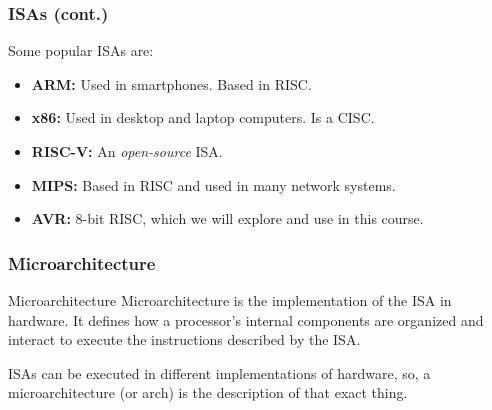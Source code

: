 \documentclass[aspectratio=169]{beamer}
\begin{document}
\begin{frame}
  \frametitle{ISAs (cont.)}
  Some popular ISAs are: \pause
  \begin{itemize}
    \item <2-> \textbf{ARM:} Used in smartphones. Based in RISC.
    \item <3-> \textbf{x86:} Used in desktop and laptop computers. Is a CISC.
    \item <4-> \textbf{RISC-V:} An \textit{open-source} ISA.
    \item <5-> \textbf{MIPS:} Based in RISC and used in many network systems.
    \item <6-> \textbf{AVR:} 8-bit RISC, which we will explore and use in this course.
  \end{itemize}
\end{frame}

\begin{frame}
  \frametitle{Microarchitecture}
  \begin{block}{Microarchitecture}
    Microarchitecture is the implementation of the ISA in hardware. It defines how a processor's internal components are organized and interact to execute the instructions described by the ISA.   
  \end{block}
  ISAs can be executed in different implementations of hardware, so, a microarchitecture (or \textmu arch) is the description of that exact thing. 
\end{frame}

\end{document}
